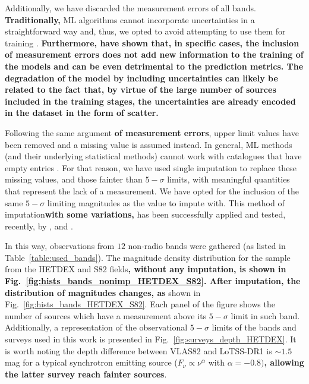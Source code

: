 \documentclass{aa}
\begin{document}
Additionally, we have discarded the measurement errors of all bands. \textbf{Traditionally,} ML algorithms cannot incorporate uncertainties in a straightforward way and, thus, we opted to avoid attempting to use them for training \citep[for some examples on how they \textbf{can be} incorporated in astrophysically motivated ML studies, see][]{2008ApJ...683...12B, 2019AJ....157...16R, 2022AJ....164....6S}. \textbf{Furthermore, \citet{2022arXiv220913074H} have shown that, in specific cases, the inclusion of measurement errors does not add new information to the training of the models and can be even detrimental to the prediction metrics. The degradation of the model by including uncertainties can likely be related to the fact that, by virtue of the large number of sources included in the training stages, the uncertainties are already encoded in the dataset in the form of scatter.}

Following the same argument \textbf{of measurement errors}, upper limit values have been removed and a missing value is assumed instead. In general, ML methods (and their underlying statistical methods) cannot work with catalogues that have empty entries \citep{allison2001missing}. For that reason, we have used single imputation \citep[a review on the use of this method in astronomy can be seen in][]{ChattopadhyayData} to replace these missing values, and those fainter than $5{-}\sigma$ limits, with meaningful quantities that represent the lack of a measurement. 
We have opted for the inclusion of the same $5{-}\sigma$ limiting magnitudes as the value to impute with. 
This method of imputation\textbf{with some variations,} has been successfully applied and tested, recently, by \citet{2020MNRAS.498.1750A, 2021Galax...9...86C, 2022MNRAS.512.2099C}, and \citet{2022MNRAS.514....1C}.

In this way, observations from $12$ non-radio bands were gathered (as listed in Table~\ref{table:used_bands}). 
The magnitude density distribution for the sample from the HETDEX and S82 fields\textbf{, without any imputation, is shown in Fig.~\ref{fig:hists_bands_nonimp_HETDEX_S82}. After imputation, the distribution of magnitudes changes, as} shown in Fig.~\ref{fig:hists_bands_HETDEX_S82}. Each panel of the figure shows the number of sources which have a measurement above its $5{-}\sigma$ limit in such band. 
Additionally, a representation of the observational $5{-}\sigma$ limits of the bands and surveys used in this work is presented in Fig.~\ref{fig:surveys_depth_HETDEX}. 
It is worth noting the depth difference between VLAS82 and LoTSS-DR1 is ${\sim}1.5$\,mag for a typical synchrotron emitting source ($F_\nu \propto \nu^{\alpha}$ with $\alpha {=}-0.8)$\textbf{, allowing the latter survey reach fainter sources}.%
\end{document}
